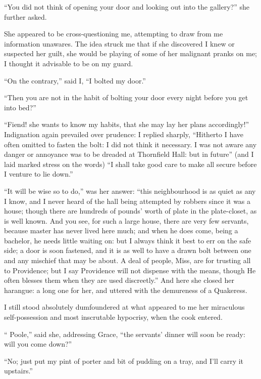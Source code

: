 \enquote{You did not think of opening your door and looking out into the
gallery?} she further asked.

She appeared to be cross-questioning me, attempting to draw from me
information unawares.  The idea struck me that if she discovered I knew
or suspected her guilt, she would be playing of some of her malignant
pranks on me; I thought it advisable to be on my guard.

\enquote{On the contrary,} said I, \enquote{I bolted my door.}

\enquote{Then you are not in the habit of bolting your door every night
before you get into bed?}

\enquote{Fiend! she wants to know my habits, that she may lay her plans
accordingly!}  Indignation again prevailed over prudence: I replied
sharply, \enquote{Hitherto I have often omitted to fasten the bolt: I
did not think it necessary.  I was not aware any danger or annoyance was
to be dreaded at Thornfield Hall: but in future} (and I laid marked
stress on the words) \enquote{I shall take good care to make all secure
before I venture to lie down.}

\enquote{It will be wise so to do,} was her answer: \enquote{this
neighbourhood is as quiet as any I know, and I never heard of the hall
being attempted by robbers since it was a house; though there are
hundreds of pounds' worth of plate in the plate-closet, as is well
known.  And you see, for such a large house, there are very few
servants, because master has never lived here much; and when he does
come, being a bachelor, he needs little waiting on: but I always think
it best to err on the safe side; a door is soon fastened, and it is as
well to have a drawn bolt between one and any mischief that may be
about.  A deal of people, Miss, are for trusting all to Providence; but
I say Providence will not dispense with the means, though He often
blesses them when they are used discreetly.}  And here she closed her
harangue: a long one for her, and uttered with the demureness of a
Quakeress.

I still stood absolutely dumfoundered at what appeared to me her
miraculous self-possession and most inscrutable hypocrisy, when the cook
entered.

\enquote{\Mrs{} Poole,} said she, addressing Grace, \enquote{the servants'
dinner will soon be ready: will you come down?}

\enquote{No; just put my pint of porter and bit of pudding on a tray,
and I'll carry it upstairs.}

